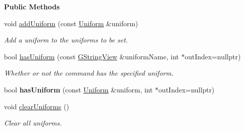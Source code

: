 \begin{Indent}\textbf{ Public Methods}\par
\begin{DoxyCompactItemize}
\item 
\mbox{\label{classrev_1_1_shadable_a2ea6672afd413fcce72fbada7572cd85}} 
void \mbox{\hyperlink{classrev_1_1_shadable_a2ea6672afd413fcce72fbada7572cd85}{add\+Uniform}} (const \mbox{\hyperlink{structrev_1_1_uniform}{Uniform}} \&uniform)
\begin{DoxyCompactList}\small\item\em Add a uniform to the uniforms to be set. \end{DoxyCompactList}\item 
\mbox{\label{classrev_1_1_shadable_ae0db24858d7de3f011803f6cd8e902e3}} 
bool \mbox{\hyperlink{classrev_1_1_shadable_ae0db24858d7de3f011803f6cd8e902e3}{has\+Uniform}} (const \mbox{\hyperlink{classrev_1_1_g_string_view}{G\+String\+View}} \&uniform\+Name, int $\ast$out\+Index=nullptr)
\begin{DoxyCompactList}\small\item\em Whether or not the command has the specified uniform. \end{DoxyCompactList}\item 
\mbox{\label{classrev_1_1_shadable_a4b03aca245a77ad3737cb5ac7eefc40e}} 
bool {\bfseries has\+Uniform} (const \mbox{\hyperlink{structrev_1_1_uniform}{Uniform}} \&uniform, int $\ast$out\+Index=nullptr)
\item 
\mbox{\label{classrev_1_1_shadable_a432dfb8203fb99b04e4e76543b99a6a4}} 
void \mbox{\hyperlink{classrev_1_1_shadable_a432dfb8203fb99b04e4e76543b99a6a4}{clear\+Uniforms}} ()
\begin{DoxyCompactList}\small\item\em Clear all uniforms. \end{DoxyCompactList}\end{DoxyCompactItemize}
\end{Indent}
